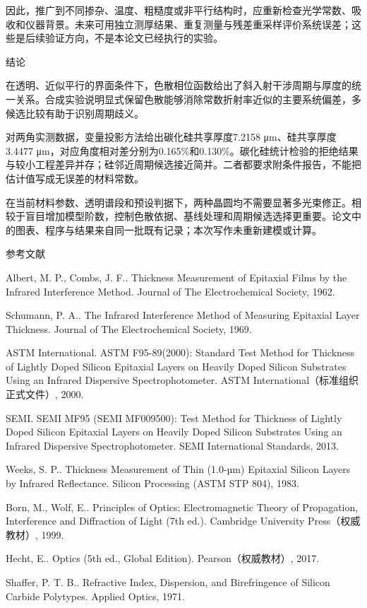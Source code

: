 因此，推广到不同掺杂、温度、粗糙度或非平行结构时，应重新检查光学常数、吸收和仪器背景。未来可用独立测厚结果、重复测量与残差重采样评价系统误差；这些是后续验证方向，不是本论文已经执行的实验。

结论

在透明、近似平行的界面条件下，色散相位函数给出了斜入射干涉周期与厚度的统一关系。合成实验说明显式保留色散能够消除常数折射率近似的主要系统偏差，多候选比较有助于识别周期歧义。

对两角实测数据，变量投影方法给出碳化硅共享厚度7.2158
μm、硅共享厚度3.4477
μm，对应角度相对差分别为0.165\%和0.130\%。碳化硅统计检验的拒绝结果与较小工程差异并存；硅邻近周期候选接近简并。二者都要求附条件报告，不能把估计值写成无误差的材料常数。

在当前材料参数、透明谱段和预设判据下，两种晶圆均不需要显著多光束修正。相较于盲目增加模型阶数，控制色散依据、基线处理和周期候选选择更重要。论文中的图表、程序与结果来自同一批既有记录；本次写作未重新建模或计算。

参考文献

Albert, M. P., Combs, J. F.. Thickness Measurement of Epitaxial Films by
the Infrared Interference Method. Journal of The Electrochemical
Society, 1962.

Schumann, P. A.. The Infrared Interference Method of Measuring Epitaxial
Layer Thickness. Journal of The Electrochemical Society, 1969.

ASTM International. ASTM F95-89(2000): Standard Test Method for
Thickness of Lightly Doped Silicon Epitaxial Layers on Heavily Doped
Silicon Substrates Using an Infrared Dispersive Spectrophotometer. ASTM
International（标准组织正式文件）, 2000.

SEMI. SEMI MF95 (SEMI MF009500): Test Method for Thickness of Lightly
Doped Silicon Epitaxial Layers on Heavily Doped Silicon Substrates Using
an Infrared Dispersive Spectrophotometer. SEMI International Standards,
2013.

Weeks, S. P.. Thickness Measurement of Thin (1.0-µm) Epitaxial Silicon
Layers by Infrared Reflectance. Silicon Processing (ASTM STP 804), 1983.

Born, M., Wolf, E.. Principles of Optics: Electromagnetic Theory of
Propagation, Interference and Diffraction of Light (7th ed.). Cambridge
University Press（权威教材）, 1999.

Hecht, E.. Optics (5th ed., Global Edition). Pearson（权威教材）, 2017.

Shaffer, P. T. B.. Refractive Index, Dispersion, and Birefringence of
Silicon Carbide Polytypes. Applied Optics, 1971.

